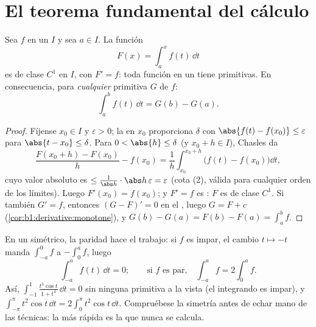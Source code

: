 \section{El teorema fundamental del cálculo}

\begin{theorem}\label{thm:b1:integration:ftc}
Sea $f$  en un  $I$ y sea $a \in I$. La función
\[
F(x) = \int_a^x f(t)\, \dd t
\]
es de clase $C^1$ en $I$, con $F' = f$: toda función  en un
 tiene primitivas. En consecuencia, para \emph{cualquier}
primitiva $G$ de $f$:
\[
\int_a^b f(t)\,\dd t = G(b) - G(a) .
\]
\end{theorem}

\begin{proof}
Fíjense $x_0 \in I$ y $\varepsilon > 0$; la  en $x_0$
proporciona $\delta$ con $\abs{f(t) - f(x_0)} \leq \varepsilon$ para
$\abs{t - x_0} \leq \delta$. Para $0 < \abs{h} \leq \delta$ (y
$x_0 + h \in I$), Chasles da
\[
\frac{F(x_0 + h) - F(x_0)}{h} - f(x_0)
= \frac 1h \int_{x_0}^{x_0+h} \bigl(f(t) - f(x_0)\bigr)\dd t ,
\]
cuyo valor absoluto es
$\leq \frac{1}{\abs h}\cdot \abs h\, \varepsilon = \varepsilon$ (cota
(2), válida para cualquier orden de los límites). Luego
$F'(x_0) = f(x_0)$; y $F' = f$ es : $F$ es de clase $C^1$. Si
también $G' = f$, entonces $(G - F)' = 0$ en el , luego
$G = F + c$ (\cref{cor:b1:derivative:monotone}), y
$G(b) - G(a) = F(b) - F(a) = \int_a^b f$.
\end{proof}

\begin{example}\label{ex:b1:integration:parity}
En un  simétrico, la paridad hace el trabajo: si $f$ es
impar, el cambio $t \mapsto -t$ manda $\int_{-a}^{0} f$ a
$-\int_0^a f$, luego
\[
\int_{-a}^{a} f(t)\,\dd t = 0 ;
\qquad\text{si $f$ es par,}\quad
\int_{-a}^{a} f = 2\int_0^a f .
\]
Así, $\int_{-1}^{1} \frac{t^3\cos t}{1 + t^4}\,\dd t = 0$ sin ninguna
primitiva a la vista (el integrando es impar), y
$\int_{-\pi}^{\pi} t^2\cos t\,\dd t = 2\int_0^\pi t^2\cos t\, \dd t$.
Compruébese la simetría antes de echar mano de las técnicas: la
 más rápida es la que nunca se calcula.
\end{example}

